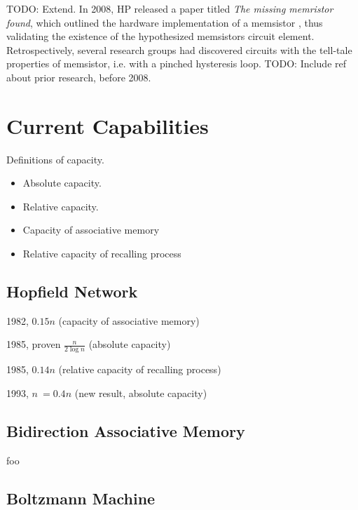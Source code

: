 \documentclass[12pt, a4paper]{article}
\begin{document}
TODO: Extend. In 2008, HP released a paper titled \textit{The missing memristor found}, which outlined the hardware implementation of a memsistor \cite{hp_memristor_found}, thus validating the existence of the hypothesized memsistors circuit element. Retrospectively, several research groups had discovered circuits with the tell-tale properties of memsistor, i.e. with a pinched hysteresis loop. TODO: Include ref about prior research, before 2008.


\section{Current Capabilities}

Definitions of capacity.

\begin{itemize}
\item Absolute capacity.
\item Relative capacity.
\item Capacity of associative memory
\item Relative capacity of recalling process
\end{itemize}

\subsection{Hopfield Network}


1982, $0.15n$ (capacity of associative memory)


1985, proven $ \frac{n}{2\log{n}} $ (absolute capacity)

1985, $0.14n$ (relative capacity of recalling process)

1993, $ n ~= 0.4n $ (new result, absolute capacity)

\subsection{Bidirection Associative Memory}


foo

\subsection{Boltzmann Machine}
\end{document}
